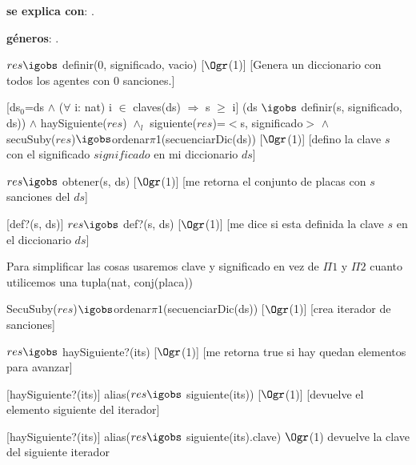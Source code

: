 \begin{Interfaz}

	\textbf{se explica con}: .

	\textbf{géneros}: .


	{$res \igobs$ definir($0$, significado, vacio)}
	[$\Ogr$(1)]
	[Genera un diccionario con todos los agentes con $0$ sanciones.]

	[ds$_0$=ds $\land$ ($\forall$ i: nat) i $\in$ claves(ds) $\Rightarrow$ s $\geq$ i]
	{(ds $\igobs$ definir(s, significado, ds)) $\land$ haySiguiente($res$) $\land_l$ siguiente($res$)=$<$s, significado$>$ $\land$\\
	secuSuby($res$)$\igobs$ordenar$\pi$1(secuenciarDic(ds))}%
	[$\Ogr$(1)]
	[defino la clave $s$ con el significado $significado$ en mi diccionario $ds$]
	
	{$res \igobs$ obtener(s, ds)}
	[$\Ogr$(1)]
	[me retorna el conjunto de placas con $s$ sanciones del $ds$]

	[def?(s, ds)]
	{$res \igobs$ def?(s, ds)}  
	[$\Ogr$(1)]
	[me dice si esta definida la clave $s$ en el diccionario $ds$]
	
	
	
	Para simplificar las cosas usaremos clave y significado en vez de $\Pi1$ y $\Pi2$ cuanto utilicemos una tupla(nat, conj(placa))
	
	{SecuSuby($res$)$\igobs$ordenar$\pi1$(secuenciarDic(ds))}
	[$\Ogr$(1)]
	[crea iterador de sanciones]
	
	{$res \igobs$ haySiguiente?(its)}
	[$\Ogr$(1)]
	[me retorna true si hay quedan elementos para avanzar]
	
	[haySiguiente?(its)]
	{alias($res \igobs$ siguiente(its))}
	[$\Ogr$(1)]
	[devuelve el elemento siguiente del iterador]
	
	[haySiguiente?(its)]
	{alias($res \igobs$ siguiente(its).clave)}
	{$\Ogr$(1)}
	{devuelve la clave del siguiente iterador}
	

\end{Interfaz}
